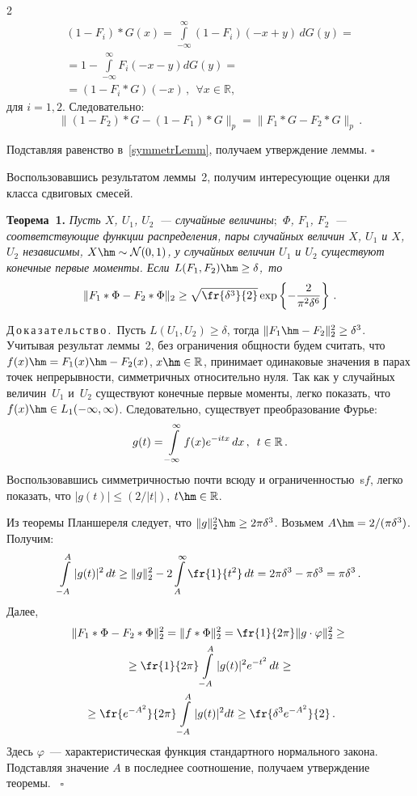 \begin{multicols}{2}
\noindent
\begin{multline*}
 (1-F_i) * G (x)  =
\int\limits_{-\infty}^{\infty} (1-F_i)(-x + y ) \,dG(y) =
{}\\
{}=
1-\int\limits_{-\infty}^{\infty}  F_i(-x - y )  d G(y) ={}\\
{}= (1-F_i  * G) ( - x)\,,\ \
  \forall x \in \mathbb{R},
\end{multline*}
для $i=1,2$. Следовательно:
$$\|
 (1-F_2) * G  - (1-F_1)*G
\|_{p} = \|
  F_1  * G  - F_2 * G
\|_{p}\,.
$$

\pagebreak

\noindent
Подставляя равенство в~\eqref{symmetrLemm}, получаем утверждение леммы. \hfill$\square$

Воспользовавшись результатом леммы~2, получим интересующие оценки
для класса сдвиговых смесей.  

\medskip

\noindent
\textbf{Теорема~1.}
\textit{Пусть $X$, $U_1$, $U_2$~--- случайные величины$;$ $\Phi$, $F_1$,
$F_2$~--- соответствующие функции распределения, пары случайных
величин $X$, $U_1$ и $X$, $U_2$  независимы,
$X \hm\sim \mathcal{N}(0,1)$, у случайных величин $U_1$ и $U_2$
существуют конечные первые моменты. Если $L(F_1,F_2) \hm\ge \delta$,~то}
$$
\|  F_1  * \Phi  - F_2 * \Phi \|_{2}\ge
\sqrt{\fr{ \delta^{3}}{2}}
\exp\left\{-\frac{2}{\pi^2\delta^6}\right\}
\,.
$$

\noindent
Д\,о\,к\,а\,з\,а\,т\,е\,л\,ь\,с\,т\,в\,о\,.\ 
Пусть $L(U_1,U_2) \ge \delta$, тогда $\|  F_1  \hm-F_2
\|_{2}^2\ge\delta^3$. Учитывая результат леммы~2,
без ограничения общности будем считать, что $f( x )\hm= F_1 (x) \hm- F_2
(x)$, $x \hm\in \mathbb{R}$, принимает одинаковые значения в парах
точек непрерывности, симметричных относительно нуля. Так как у
случайных величин~$U_1$ и~$U_2$ существуют конечные первые моменты,
легко показать, что $f(x) \hm\in L_1(-\infty, \infty)$. Следовательно,
существует преобразование Фурье:
$$
g(t) = \int\limits_{-\infty}^{\infty}
f(x) e^{-i t x}\,dx\,,  \enskip t \in \mathbb{R}\,.
$$
Воспользовавшись симметричностью почти всюду и ограниченностью~s$f$,
легко показать, что $|g(t)|\le(2/|t|)$, $t \hm\in \mathbb{R}$.

Из теоремы Планшереля следует, что $ \|g \|^2_{2}\hm\ge 2\pi
\delta^3$. Возьмем $A \hm= {2}/({\pi\delta^3})$. Получим:
$$ 
\int\limits_{-A}^{A}
|g(t)|^2\, dt
\ge
\|g \|^2_{2} -
2 \int\limits_{A}^{\infty}\fr{1}{t^2}\,dt
 =  2\pi \delta^3 -   \pi \delta^3 =   \pi \delta^3\,.
 $$
Далее,
\begin{multline*}
\|  F_1  * \Phi  - F_2 * \Phi \|_{2}^2 =
 \|  f * \Phi    \|_{2}^2 =
\fr{1}{2 \pi} \| g \cdot \varphi    \|_{2}^2 \ge
{}\\
{}
\ge\fr{1}{2 \pi}
\int\limits_{-A}^{A}|g(t)|^2 e^{-t^2}\,dt
\ge {}\\
{}\ge\fr{e^{-A^2}}{2 \pi}
\int\limits_{-A}^{A}
|g(t)|^2  dt \ge \fr{ \delta^3e^{-A^2}}{2}\,.
\end{multline*}
Здесь $\varphi$~--- характеристическая функция стандартного
нормального закона. Подставляя значение $A$ в последнее соотношение,
получаем утверждение теоремы. \hfill~$\square$


\end{multicols}
